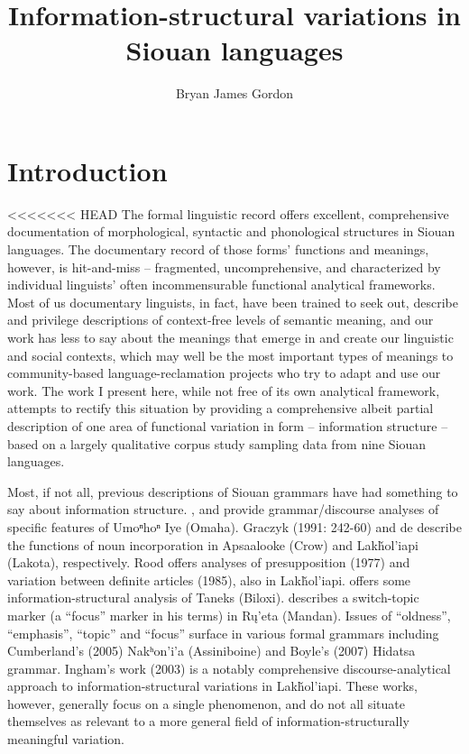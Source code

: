 \documentclass[output=paper]{LSP/langsci}
\author{Bryan James Gordon}
\title{Information-structural variations in Siouan languages}
\begin{document}
\section{Introduction}

<<<<<<< HEAD
	The formal linguistic record offers excellent, comprehensive documentation of morphological, syntactic and phonological structures in Siouan languages. The documentary record of those forms’ functions and meanings, however, is hit-and-miss -- fragmented, uncomprehensive, and characterized by individual linguists’ often incommensurable functional analytical frameworks. Most of us documentary linguists, in fact, have been trained to seek out, describe and privilege descriptions of context-free levels of semantic meaning, and our work has less to say about the meanings that emerge in and create our linguistic and social contexts, which may well be the most important types of meanings to community-based language-reclamation projects who try to adapt and use our work. The work I present here, while not free of its own analytical framework, attempts to rectify this situation by providing a comprehensive albeit partial description of one area of functional variation in form -- information structure -- based on a largely qualitative corpus study sampling data from nine Siouan languages.
	
	Most, if not all, previous descriptions of Siouan grammars have had something to say about information structure. \citet{Rudin1998}, \citet{Koontz2003} and \citet{Eschenberg2005} provide grammar/discourse analyses of specific features of Umoⁿhoⁿ Iye (Omaha). Graczyk (1991: 242-60) and de \citet{Reuse1994} describe the functions of noun incorporation in Apsaalooke (Crow) and Lakȟol’iapi (Lakota), respectively. Rood offers analyses of presupposition (1977) and variation between definite articles (1985), also in Lakȟol’iapi. \citet{Kaufman2008} offers some information-structural analysis of Taneks (Biloxi). \citet{Wolvengrey1990} describes a switch-topic marker (a “focus” marker in his terms) in Rų’eta (Mandan). Issues of “oldness”, “emphasis”, “topic” and “focus” surface in various formal grammars including Cumberland’s (2005) Nakʰon’i’a (Assiniboine) and Boyle’s (2007) Hidatsa grammar. Ingham’s work (2003) is a notably comprehensive discourse-analytical approach to information-structural variations in La\-kȟol\-’ia\-pi. These works, however, generally focus on a single phenomenon, and do not all situate themselves as relevant to a more general field of information-structurally meaningful variation. 
	
\end{document}
